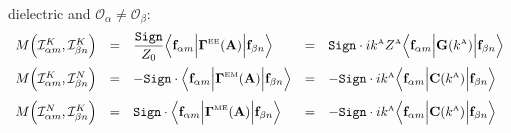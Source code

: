 \documentclass[dvips,letterpaper]{article}
\begin{document}
\begin{enumerate}
{               dielectric and $\mathcal{O}_\alpha \ne \mathcal{O}_\beta$:}
$$\begin{array}{lclcl}
 M\Big( \mathcal{I}^K_{\alpha m}, \mathcal{I}^K_{\beta n} \Big) 
  &=& 
  \displaystyle{ \frac{\texttt{Sign}}{Z_0} 
                 \Big\langle \vb f_{\alpha m} 
                 \Big| \BG\supt{EE}(\vb A) \Big|
                 \vb f_{\beta n} 
                 \Big\rangle
               }
  &=&
  \displaystyle{ \texttt{Sign}\cdot ik\supt{A} Z\supt{A}
                 \Big\langle \vb f_{\alpha m} 
                 \Big| \vb G(k\supt{A}) \Big|
                 \vb f_{\beta n} 
                 \Big\rangle
               }
\\[10pt]
 M\Big( \mathcal{I}^K_{\alpha m}, \mathcal{I}^N_{\beta n} \Big) 
  &=&
  \displaystyle{ -\texttt{Sign}\cdot
                 \Big\langle 
                 \vb f_{\alpha m} 
                 \Big|\BG\supt{EM}(\vb A) \Big|
                 \vb f_{\beta n} 
                 \Big\rangle
               }
  &=&
  \displaystyle{ -\texttt{Sign}\cdot ik\supt{A}
                  \Big\langle 
                  \vb f_{\alpha m} 
                  \Big| \vb C(k\supt{A})\Big|
                  \vb f_{\beta n} 
                  \Big\rangle
               }
\\[10pt]
 M\Big( \mathcal{I}^N_{\alpha m}, \mathcal{I}^K_{\beta n} \Big) 
  &=&
  \displaystyle{ \texttt{Sign}\cdot
                 \Big\langle 
                 \vb f_{\alpha m} 
                 \Big|\BG\supt{ME}(\vb A) \Big|
                 \vb f_{\beta n} 
                 \Big\rangle
               }
  &=&
  \displaystyle{ -\texttt{Sign}\cdot ik\supt{A}
                  \Big\langle 
                  \vb f_{\alpha m} 
                  \Big| \vb C(k\supt{A})\Big|
                  \vb f_{\beta n} 
                  \Big\rangle
               }
\\[10pt]

\end{array}$$
\end{enumerate}
\end{document}
